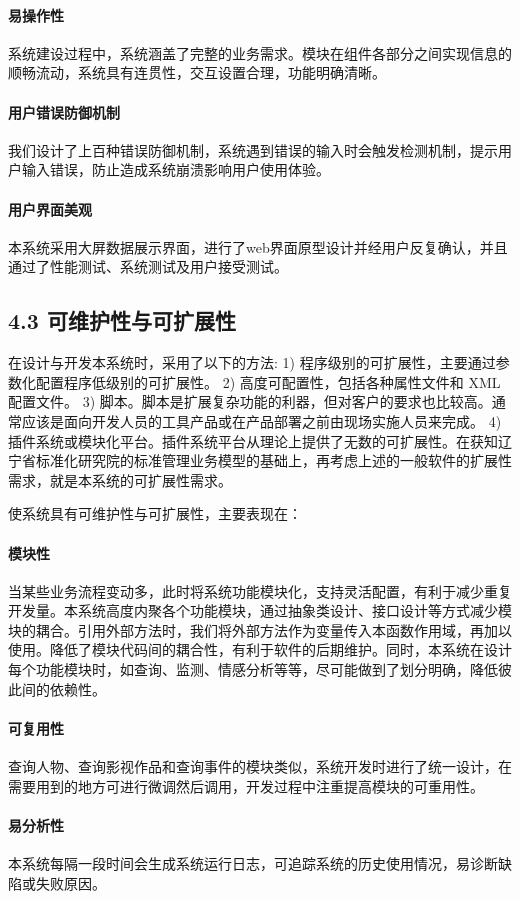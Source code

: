 \paragraph{易操作性}
系统建设过程中，系统涵盖了完整的业务需求。模块在组件各部分之间实现信息的顺畅流动，系统具有连贯性，交互设置合理，功能明确清晰。
\paragraph{用户错误防御机制}
我们设计了上百种错误防御机制，系统遇到错误的输入时会触发检测机制，提示用户输入错误，防止造成系统崩溃影响用户使用体验。
\paragraph{用户界面美观}
本系统采用大屏数据展示界面，进行了web界面原型设计并经用户反复确认，并且通过了性能测试、系统测试及用户接受测试。

\subsection{4.3 可维护性与可扩展性}
在设计与开发本系统时，采用了以下的方法:
1) 程序级别的可扩展性，主要通过参数化配置程序低级别的可扩展性。
2) 高度可配置性，包括各种属性文件和 XML 配置文件。
3) 脚本。脚本是扩展复杂功能的利器，但对客户的要求也比较高。通常应该是面向开发人员的工具产品或在产品部署之前由现场实施人员来完成。
4) 插件系统或模块化平台。插件系统平台从理论上提供了无数的可扩展性。在获知辽宁省标准化研究院的标准管理业务模型的基础上，再考虑上述的一般软件的扩展性需求，就是本系统的可扩展性需求。

使系统具有可维护性与可扩展性，主要表现在：
\paragraph{模块性}
当某些业务流程变动多，此时将系统功能模块化，支持灵活配置，有利于减少重复开发量。本系统高度内聚各个功能模块，通过抽象类设计、接口设计等方式减少模块的耦合。引用外部方法时，我们将外部方法作为变量传入本函数作用域，再加以使用。降低了模块代码间的耦合性，有利于软件的后期维护。同时，本系统在设计每个功能模块时，如查询、监测、情感分析等等，尽可能做到了划分明确，降低彼此间的依赖性。
\paragraph{可复用性}
查询人物、查询影视作品和查询事件的模块类似，系统开发时进行了统一设计，在需要用到的地方可进行微调然后调用，开发过程中注重提高模块的可重用性。
\paragraph{易分析性}
本系统每隔一段时间会生成系统运行日志，可追踪系统的历史使用情况，易诊断缺陷或失败原因。
